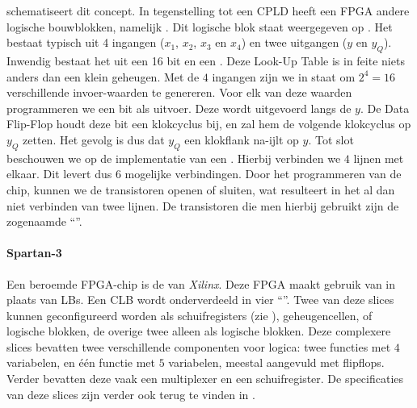 schematiseert dit concept. In tegenstelling tot een CPLD heeft een FPGA andere logische bouwblokken, namelijk . Dit logische blok staat weergegeven op . Het bestaat typisch uit 4 ingangen ($x_1$, $x_2$, $x_3$ en $x_4$) en twee uitgangen ($y$ en $y_Q$). Inwendig bestaat het uit een 16 bit  en een . Deze Look-Up Table is in feite niets anders dan een klein geheugen. Met de $4$ ingangen zijn we in staat om $2^4=16$ verschillende invoer-waarden te genereren. Voor elk van deze waarden programmeren we een bit als uitvoer. Deze wordt uitgevoerd langs de $y$. De Data Flip-Flop houdt deze bit een klokcyclus bij, en zal hem de volgende klokcyclus op $y_Q$ zetten. Het gevolg is dus dat $y_Q$ een klokflank na-ijlt op $y$. Tot slot beschouwen we op  de implementatie van een . Hierbij verbinden we $4$ lijnen met elkaar. Dit levert dus 6 mogelijke verbindingen. Door het programmeren van de chip, kunnen we de transistoren openen of sluiten, wat resulteert in het al dan niet verbinden van twee lijnen. De transistoren die men hierbij gebruikt zijn de zogenaamde ``''.

\paragraph{Spartan-3}
Een beroemde FPGA-chip is de  van \emph{Xilinx}. Deze FPGA maakt gebruik van  in plaats van LBs. Een CLB wordt onderverdeeld in vier ``''. Twee van deze slices kunnen geconfigureerd worden als schuifregisters (zie ), geheugencellen, of logische blokken, de overige twee alleen als logische blokken. Deze complexere slices bevatten twee verschillende componenten voor logica: twee functies met $4$ variabelen, en \'e\'en functie met $5$ variabelen, meestal aangevuld met flipflops. Verder bevatten deze vaak een multiplexer en een schuifregister. De specificaties van deze slices zijn verder ook terug te vinden in \cite[p.~22-23]{xilinxFpgaDs099}.

